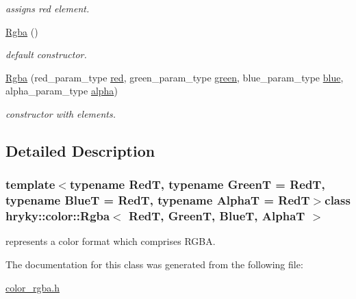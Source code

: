 \begin{DoxyCompactItemize}
\begin{DoxyCompactList}\small\item\em assigns red element. \end{DoxyCompactList}\item 
\hypertarget{classhryky_1_1color_1_1_rgba_a6d0c88b08d75b5edff7139d79e3b2d12}{\hyperlink{classhryky_1_1color_1_1_rgba_a6d0c88b08d75b5edff7139d79e3b2d12}{Rgba} ()}\label{classhryky_1_1color_1_1_rgba_a6d0c88b08d75b5edff7139d79e3b2d12}

\begin{DoxyCompactList}\small\item\em default constructor. \end{DoxyCompactList}\item 
\hypertarget{classhryky_1_1color_1_1_rgba_af28086f86c43a308f2be904e117c43b5}{\hyperlink{classhryky_1_1color_1_1_rgba_af28086f86c43a308f2be904e117c43b5}{Rgba} (red\-\_\-param\-\_\-type \hyperlink{classhryky_1_1color_1_1_rgba_a5f7e40c9b9acddd1d625af0e75b8bbb2}{red}, green\-\_\-param\-\_\-type \hyperlink{classhryky_1_1color_1_1_rgba_a95b3fc0f8f305b52849c26de0c2ef717}{green}, blue\-\_\-param\-\_\-type \hyperlink{classhryky_1_1color_1_1_rgba_a31f7a7232ee91a12615da162adae7120}{blue}, alpha\-\_\-param\-\_\-type \hyperlink{classhryky_1_1color_1_1_rgba_a348c8dd4c3dd8fb08d6748a7d62dcf12}{alpha})}\label{classhryky_1_1color_1_1_rgba_af28086f86c43a308f2be904e117c43b5}

\begin{DoxyCompactList}\small\item\em constructor with elements. \end{DoxyCompactList}\end{DoxyCompactItemize}


\subsection{Detailed Description}
\subsubsection*{template$<$typename Red\-T, typename Green\-T = Red\-T, typename Blue\-T = Red\-T, typename Alpha\-T = Red\-T$>$class hryky\-::color\-::\-Rgba$<$ Red\-T, Green\-T, Blue\-T, Alpha\-T $>$}

represents a color format which comprises R\-G\-B\-A. 

The documentation for this class was generated from the following file\-:\begin{DoxyCompactItemize}
\item 
\hyperlink{color__rgba_8h}{color\-\_\-rgba.\-h}\end{DoxyCompactItemize}
